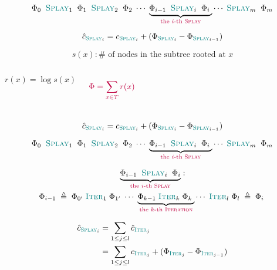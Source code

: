 \begin{frame}{}
  \[
    \Phi_{0}\;\; \textsc{\textcolor{teal}{Splay}}_{1} \;\;
    \Phi_{1}\;\; \textsc{\textcolor{teal}{Splay}}_{2} \;\;
    \Phi_{2}\;
    \cdots\;
    \underbrace{\Phi_{i-1}\;\; \textsc{\textcolor{teal}{Splay}}_{i}\;\; \Phi_{i}\;}_{\textcolor{purple}{\text{the $i$-th \textsc{Splay}}}}
    \cdots\;
    \textsc{\textcolor{teal}{Splay}}_{m}\;\; 
    \Phi_{m}
  \]

  \[
    \hat{c}_{\textsc{\textcolor{teal}{Splay}}_{i}} =  c_{\textsc{\textcolor{teal}{Splay}}_{i}} + (\Phi_{\textsc{\textcolor{teal}{Splay}}_{i}} - \Phi_{\textsc{\textcolor{teal}{Splay}}_{i-1}})
  \]

  \pause
  \vspace{0.60cm}
  \begin{center}
  \end{center}
\end{frame}

\begin{frame}{}
  \[
    s(x): \# \text{ of nodes in the subtree rooted at } x
  \]

  \begin{columns}
      \pause
      \[
	r(x) = \log s(x)
      \]

      \pause
      \[
	\textcolor{purple}{\Phi = \sum_{x \in T} r(x)}
      \]
      \pause
  \end{columns}

  \pause
  \vspace{0.50cm}
  \[
    \hat{c}_{\textsc{\textcolor{teal}{Splay}}_{i}} =  c_{\textsc{\textcolor{teal}{Splay}}_{i}} + (\Phi_{\textsc{\textcolor{teal}{Splay}}_{i}} - \Phi_{\textsc{\textcolor{teal}{Splay}}_{i-1}})
  \]

  \begin{center}
  \end{center}
\end{frame}

\begin{frame}{}
  \[
    \Phi_{0}\;\; \textsc{\textcolor{teal}{Splay}}_{1} \;\;
    \Phi_{1}\;\; \textsc{\textcolor{teal}{Splay}}_{2} \;\;
    \Phi_{2}\;
    \cdots\;
    \underbrace{\Phi_{i-1}\;\; \textsc{\textcolor{teal}{Splay}}_{i}\;\; \Phi_{i}\;}_{\textcolor{purple}{\text{the $i$-th \textsc{Splay}}}}
    \cdots\;
    \textsc{\textcolor{teal}{Splay}}_{m}\;\; 
    \Phi_{m}
  \]

  \pause
  \begin{gather*}
    \underbrace{\Phi_{i-1}\;\; \textsc{\textcolor{teal}{Splay}}_{i}\;\; \Phi_{i}}_{\textcolor{purple}{\text{the $i$-th \textsc{Splay}}}}: \\
    \Phi_{i-1} \;\triangleq\; \Phi_{0'}\; \textsc{\textcolor{teal}{Iter}}_{1}\; \Phi_{1'}\; 
    \cdots\;
    \underbrace{\Phi_{k-1}\; \textsc{\textcolor{teal}{Iter}}_{k}\; \Phi_{k}\;}_{\textcolor{purple}{\text{the $k$-th \textsc{Iteration}}}}
    \cdots\;
    \textsc{\textcolor{teal}{Iter}}_{l}\; \Phi_{l} \;\triangleq\; \Phi_{i}\;
  \end{gather*}

  \pause
  \begin{align*}
    \hat{c}_{\textsc{\textcolor{teal}{Splay}}_{i}} &= \sum_{1 \le j \le l} \hat{c}_{\textsc{\textcolor{teal}{Iter}}_{j}} \\
      &= \sum_{1 \le j \le l} c_{\textsc{\textcolor{teal}{Iter}}_{j}} + (\Phi_{\textsc{\textcolor{teal}{Iter}}_{j}} - \Phi_{\textsc{\textcolor{teal}{Iter}}_{j-1}})
  \end{align*}
\end{frame}

